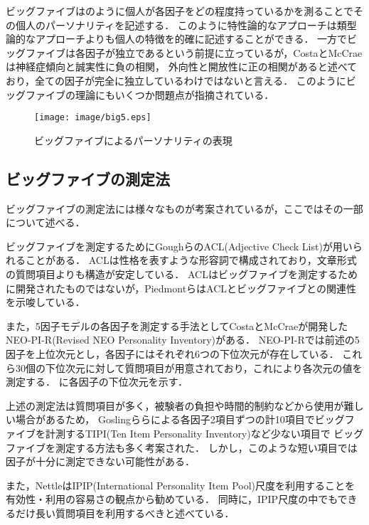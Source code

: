 ビッグファイブはのように個人が各因子をどの程度持っているかを測ることでその個人のパーソナリティを記述する．
このように特性論的なアプローチは類型論的なアプローチよりも個人の特徴を的確に記述することができる．
一方でビッグファイブは各因子が独立であるという前提に立っているが，CostaとMcCrae\cite{neo-pi-r}は神経症傾向と誠実性に負の相関，
外向性と開放性に正の相関があると述べており，全ての因子が完全に独立しているわけではないと言える\cite{eysenck-handbook}．
このようにビッグファイブの理論にもいくつか問題点が指摘されている．

\begin{figure}[htb]
    \centering
    \texttt{[image: image/big5.eps]}
    \caption{ビッグファイブによるパーソナリティの表現}
    \label{fig:big5}
\end{figure}

\subsection{ビッグファイブの測定法}
ビッグファイブの測定法には様々なものが考案されているが，ここではその一部について述べる．

ビッグファイブを測定するためにGoughら\cite{acl}のACL(Adjective Check List)が用いられることがある．
ACLは性格を表すような形容詞で構成されており，文章形式の質問項目よりも構造が安定している．
ACLはビッグファイブを測定するために開発されたものではないが，Piedmontら\cite{big5-acl}はACLとビッグファイブとの関連性を示唆している．

また，5因子モデルの各因子を測定する手法としてCostaとMcCrae\cite{neo-pi-r}が開発したNEO-PI-R(Revised NEO Personality Inventory)がある．
NEO-PI-Rでは前述の5因子を上位次元とし，各因子にはそれぞれ6つの下位次元が存在している．
これら30個の下位次元に対して質問項目が用意されており，これにより各次元の値を測定する．
に各因子の下位次元を示す．

上述の測定法は質問項目が多く，被験者の負担や時間的制約などから使用が難しい場合があるため，
Goslingら\cite{tipi}らによる各因子2項目ずつの計10項目でビッグファイブを計測するTIPI(Ten Item Personality Inventory)など少ない項目で
ビッグファイブを測定する方法も多く考案された．
しかし，このような短い項目では因子が十分に測定できない可能性がある．

また，Nettle\cite{daniel}はIPIP(International Personality Item Pool)尺度を利用することを有効性・利用の容易さの観点から勧めている．
同時に，IPIP尺度の中でもできるだけ長い質問項目を利用するべきと述べている．

